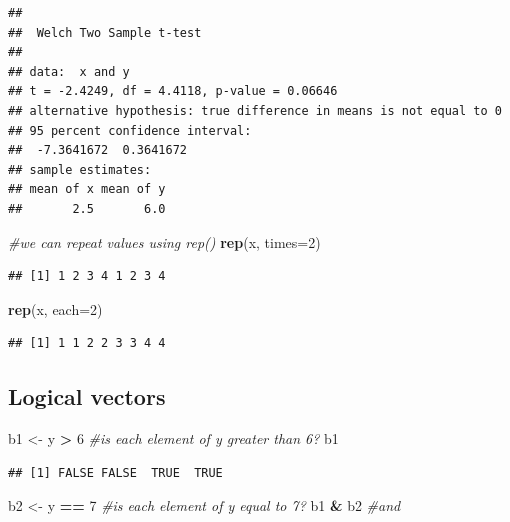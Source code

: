 \documentclass[]{article}
\newenvironment{Shaded}{\begin{snugshade}}{\end{snugshade}}
\newcommand{\KeywordTok}[1]{\textcolor[rgb]{0.13,0.29,0.53}{\textbf{#1}}}
\newcommand{\DataTypeTok}[1]{\textcolor[rgb]{0.13,0.29,0.53}{#1}}
\newcommand{\DecValTok}[1]{\textcolor[rgb]{0.00,0.00,0.81}{#1}}
\newcommand{\StringTok}[1]{\textcolor[rgb]{0.31,0.60,0.02}{#1}}
\newcommand{\CommentTok}[1]{\textcolor[rgb]{0.56,0.35,0.01}{\textit{#1}}}
\newcommand{\OperatorTok}[1]{\textcolor[rgb]{0.81,0.36,0.00}{\textbf{#1}}}
\newcommand{\NormalTok}[1]{#1}
\begin{document}
\begin{verbatim}
## 
##  Welch Two Sample t-test
## 
## data:  x and y
## t = -2.4249, df = 4.4118, p-value = 0.06646
## alternative hypothesis: true difference in means is not equal to 0
## 95 percent confidence interval:
##  -7.3641672  0.3641672
## sample estimates:
## mean of x mean of y 
##       2.5       6.0
\end{verbatim}

\begin{Shaded}
\begin{Highlighting}[]
\CommentTok{#we can repeat values using rep()}
\KeywordTok{rep}\NormalTok{(x, }\DataTypeTok{times=}\DecValTok{2}\NormalTok{)}
\end{Highlighting}
\end{Shaded}

\begin{verbatim}
## [1] 1 2 3 4 1 2 3 4
\end{verbatim}

\begin{Shaded}
\begin{Highlighting}[]
\KeywordTok{rep}\NormalTok{(x, }\DataTypeTok{each=}\DecValTok{2}\NormalTok{)}
\end{Highlighting}
\end{Shaded}

\begin{verbatim}
## [1] 1 1 2 2 3 3 4 4
\end{verbatim}

\subsection{Logical vectors}\label{logical-vectors}

\begin{Shaded}
\begin{Highlighting}[]
\NormalTok{b1 <-}\StringTok{ }\NormalTok{y }\OperatorTok{>}\StringTok{ }\DecValTok{6} \CommentTok{#is each element of y greater than 6?}
\NormalTok{b1}
\end{Highlighting}
\end{Shaded}

\begin{verbatim}
## [1] FALSE FALSE  TRUE  TRUE
\end{verbatim}

\begin{Shaded}
\begin{Highlighting}[]
\NormalTok{b2 <-}\StringTok{ }\NormalTok{y }\OperatorTok{==}\StringTok{ }\DecValTok{7} \CommentTok{#is each element of y equal to 7?}
\NormalTok{b1 }\OperatorTok{&}\StringTok{ }\NormalTok{b2 }\CommentTok{#and}
\end{Highlighting}
\end{Shaded}
\end{document}
